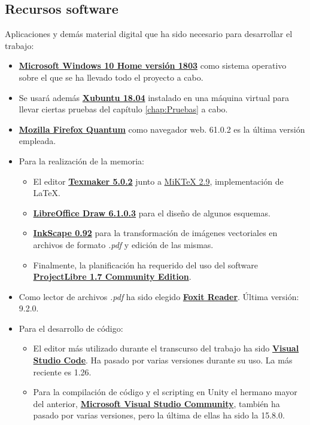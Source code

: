 \subsection{Recursos software}
Aplicaciones y demás material digital que ha sido necesario para desarrollar el trabajo:
\begin{itemize}
\item \href{https://www.microsoft.com/es-es/windows}{\textbf{Microsoft Windows 10 Home versión 1803}} como sistema operativo sobre el que se ha llevado todo el proyecto a cabo.
\item Se usará además \href{https://xubuntu.org/about/}{\textbf{Xubuntu 18.04}} instalado en una máquina virtual para llevar ciertas pruebas del capítulo \ref{chap:Pruebas} a cabo.
\item \href{https://www.mozilla.org/es-ES/firefox/}{\textbf{Mozilla Firefox Quantum}} como navegador web. 61.0.2 es la última versión empleada.
\item Para la realización de la memoria:
\begin{itemize}
\item El editor \href{http://www.xm1math.net/texmaker/}{\textbf{Texmaker 5.0.2}} junto a \href{https://miktex.org/about}{MiKTeX 2.9}, implementación de \LaTeX.
\item \href{https://es.libreoffice.org/descubre/draw/}{\textbf{LibreOffice Draw 6.1.0.3}} para el diseño de algunos esquemas.
\item \href{https://inkscape.org/es/}{\textbf{InkScape 0.92}} para la transformación de imágenes vectoriales en archivos de formato \textit{.pdf} y edición de las mismas.
\item Finalmente, la planificación ha requerido del uso del software \href{http://www.projectlibre.com/}{\textbf{ProjectLibre 1.7 Community Edition}}.
\end{itemize}
\item Como lector de archivos \textit{.pdf} ha sido elegido \href{https://www.foxitsoftware.com/pdf-reader/}{\textbf{Foxit Reader}}. Última versión: 9.2.0.
\item Para el desarrollo de código:
\begin{itemize}
\item El editor más utilizado durante el transcurso del trabajo ha sido \href{https://code.visualstudio.com/}{\textbf{Visual Studio Code}}. Ha pasado por varias versiones durante su uso. La más reciente es 1.26.
\item Para la compilación de código y el scripting en Unity el hermano mayor del anterior, \href{https://visualstudio.microsoft.com/es/}{\textbf{Microsoft Visual Studio Community}}, también ha pasado por varias versiones, pero la última de ellas ha sido la 15.8.0.

\end{itemize}
\end{itemize}
